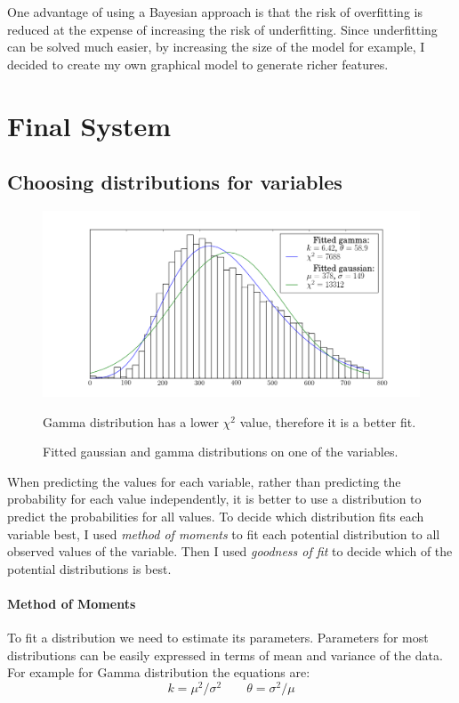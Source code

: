 \documentclass[12pt,a4paper]{book}
\newcommand\note[1]{\vspace*{-0.5\baselineskip}\caption*{#1}}
\begin{document}
One advantage of using a Bayesian approach is that the risk of overfitting is reduced at the expense of increasing the risk of underfitting.
Since underfitting can be solved much easier, by increasing the size of the model for example, I decided to create my own graphical model to generate richer features.
\section{Final System}
\subsection{Choosing distributions for variables}
\begin{figure}[ht]
\centering
\includegraphics[scale=0.5]{fitted-distributions}
\caption{Fitted gaussian and gamma distributions on one of the variables.}
\note{Gamma distribution has a lower $\chi^2$ value, therefore it is a better fit.}
\label{fig:fitted-distributions}
\end{figure}
When predicting the values for each variable, rather than predicting the probability for each value independently, it is better to use a distribution to predict the probabilities for all values.
To decide which distribution fits each variable best, I used \emph{method of moments} to fit each potential distribution to all observed values of the variable.
Then I used \emph{goodness of fit} to decide which of the potential distributions is best.
\paragraph{Method of Moments}
To fit a distribution we need to estimate its parameters.
Parameters for most distributions can be easily expressed in terms of mean and variance of the data.
For example for Gamma distribution the equations are:
\begin{equation}
k= \mu^2/\sigma^2
\qquad
\theta = \sigma^2/\mu
\end{equation}
\end{document}

